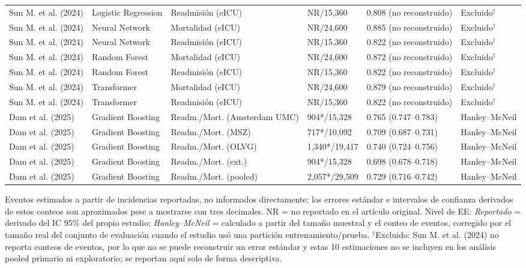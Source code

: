 \begin{table}[H]
\begin{adjustbox}{max width=\textwidth}
\begin{tabular}{llllll}
    Sun M. et al. (2024) & Logistic Regression & Readmisión (eICU) & NR/15,360 & 0.808 (no reconstruido) & Excluido$^\dagger$ \\
    Sun M. et al. (2024) & Neural Network & Mortalidad (eICU) & NR/24,600 & 0.885 (no reconstruido) & Excluido$^\dagger$ \\
    Sun M. et al. (2024) & Neural Network & Readmisión (eICU) & NR/15,360 & 0.822 (no reconstruido) & Excluido$^\dagger$ \\
    Sun M. et al. (2024) & Random Forest & Mortalidad (eICU) & NR/24,600 & 0.872 (no reconstruido) & Excluido$^\dagger$ \\
    Sun M. et al. (2024) & Random Forest & Readmisión (eICU) & NR/15,360 & 0.822 (no reconstruido) & Excluido$^\dagger$ \\
    Sun M. et al. (2024) & Transformer & Mortalidad (eICU) & NR/24,600 & 0.879 (no reconstruido) & Excluido$^\dagger$ \\
    Sun M. et al. (2024) & Transformer & Readmisión (eICU) & NR/15,360 & 0.822 (no reconstruido) & Excluido$^\dagger$ \\
    Dam et al. (2025) & Gradient Boosting & Readm./Mort. (Amsterdam UMC) & 904*/15,328 & 0.765 (0.747--0.783) & Hanley--McNeil \\
    Dam et al. (2025) & Gradient Boosting & Readm./Mort. (MSZ) & 717*/10,092 & 0.709 (0.687--0.731) & Hanley--McNeil \\
    Dam et al. (2025) & Gradient Boosting & Readm./Mort. (OLVG) & 1,340*/19,417 & 0.740 (0.724--0.756) & Hanley--McNeil \\
    Dam et al. (2025) & Gradient Boosting & Readm./Mort. (ext.) & 904*/15,328 & 0.698 (0.678--0.718) & Hanley--McNeil \\
    Dam et al. (2025) & Gradient Boosting & Readm./Mort. (pooled) & 2,057*/29,509 & 0.729 (0.716--0.742) & Hanley--McNeil \\
\bottomrule
\end{tabular}
\end{adjustbox}
\par\vspace{0.4em}\footnotesize * Eventos estimados a partir de incidencias reportadas, no informados directamente; los errores estándar e intervalos de confianza derivados de estos conteos son aproximados pese a mostrarse con tres decimales. NR = no reportado en el artículo original. Nivel de EE: \emph{Reportado} = derivado del IC 95\% del propio estudio; \emph{Hanley--McNeil} = calculado a partir del tamaño muestral y el conteo de eventos, corregido por el tamaño real del conjunto de evaluación cuando el estudio usó una partición entrenamiento/prueba. $^\dagger$Excluido: Sun M. et al. (2024) no reporta conteos de eventos, por lo que no se puede reconstruir un error estándar y estas 10 estimaciones no se incluyen en los análisis pooled primario ni exploratorio; se reportan aquí solo de forma descriptiva.
\end{table}
